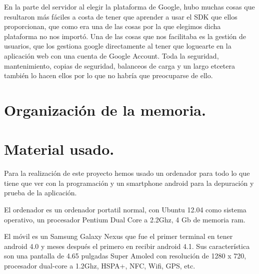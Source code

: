 En la parte del servidor al elegir la plataforma de Google, hubo muchas cosas que resultaron más fáciles a costa de tener que aprender a usar el SDK que ellos proporcionan, que como era una de las cosas por la que elegimos dicha plataforma no nos importó. Una de las cosas que nos facilitaba es la gestión de usuarios, que los gestiona google directamente al tener que loguearte en la aplicación web con una cuenta de Google Account. Toda la seguridad, mantenimiento, copias de seguridad, balanceos de carga y un largo etcetera también lo hacen ellos por lo que no habría que preocuparse de ello.

\section{Organización de la memoria.}

\section{Material usado.}
Para la realización de este proyecto hemos usado un ordenador para todo lo que tiene que ver con la programación y un smartphone android para la depuración y prueba de la aplicación. 

El ordenador es un ordenador portatil normal, con Ubuntu 12.04 como sistema operativo, un procesador Pentium Dual Core a 2.2Ghz, 4 Gb de memoria ram.

El móvil es un Samsung Galaxy Nexus que fue el primer terminal en tener android 4.0 y meses después el primero en recibir android 4.1. Sus característica son una pantalla de 4.65 pulgadas Super Amoled con resolución de 1280 x 720, procesador dual-core a 1.2Ghz, HSPA+, NFC, Wifi, GPS, etc.


